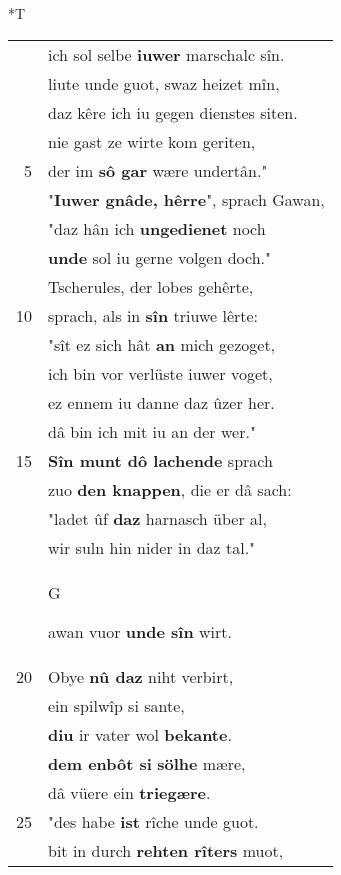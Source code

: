 \documentclass[8pt,a4paper,notitlepage]{article}
\begin{document}
\begin{table}[ht]
\begin{minipage}[t]{0.5\linewidth}
\end{minipage}
\hspace{0.5cm}
\begin{minipage}[t]{0.5\linewidth}
\small
\begin{center}*T
\end{center}
\begin{tabular}{rl}
 & ich sol selbe \textbf{iuwer} marschalc sîn.\\ 
 & liute unde guot, swaz heizet mîn,\\ 
 & daz kêre ich iu gegen dienstes siten.\\ 
 & nie gast ze wirte kom geriten,\\ 
5 & der im \textbf{sô gar} wære undertân."\\ 
 & "\textbf{Iuwer gnâde, hêrre}", sprach Gawan,\\ 
 & "daz hân ich \textbf{ungedienet} noch\\ 
 & \textbf{unde} sol iu gerne volgen doch."\\ 
 & Tscherules, der lobes gehêrte,\\ 
10 & sprach, als in \textbf{sîn} triuwe lêrte:\\ 
 & "sît ez sich hât \textbf{an} mich gezoget,\\ 
 & ich bin vor verlüste iuwer voget,\\ 
 & ez ennem iu danne daz ûzer her.\\ 
 & dâ bin ich mit iu an der wer."\\ 
15 & \textbf{Sîn munt dô lachende} sprach\\ 
 & zuo \textbf{den knappen}, die er dâ sach:\\ 
 & "ladet ûf \textbf{daz} harnasch über al,\\ 
 & wir suln hin nider in daz tal."\\ 
 & \begin{large}G\end{large}awan vuor \textbf{unde sîn} wirt.\\ 
20 & Obye \textbf{nû daz} niht verbirt,\\ 
 & ein spilwîp si sante,\\ 
 & \textbf{diu} ir vater wol \textbf{bekante}.\\ 
 & \textbf{dem enbôt si} \textbf{sölhe} mære,\\ 
 & dâ vüere ein \textbf{triegære}.\\ 
25 & "des habe \textbf{ist} rîche unde guot.\\ 
 & bit in durch \textbf{rehten rîters} muot,\\ 

\end{tabular}
\end{minipage}
\end{table}
\end{document}
